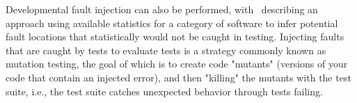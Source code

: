 Developmental fault injection can also be performed, with~\citet{natella2012fault} describing an approach using available statistics for a category of software to infer potential fault locations that statistically would not be caught in testing. Injecting faults that are caught by tests to evaluate tests is a strategy commonly known as mutation testing, the goal of which is to create code "mutants" (versions of your code that contain an injected error), and then "killing" the mutants with the test suite, i.e.,  the test suite catches unexpected behavior through tests failing.
